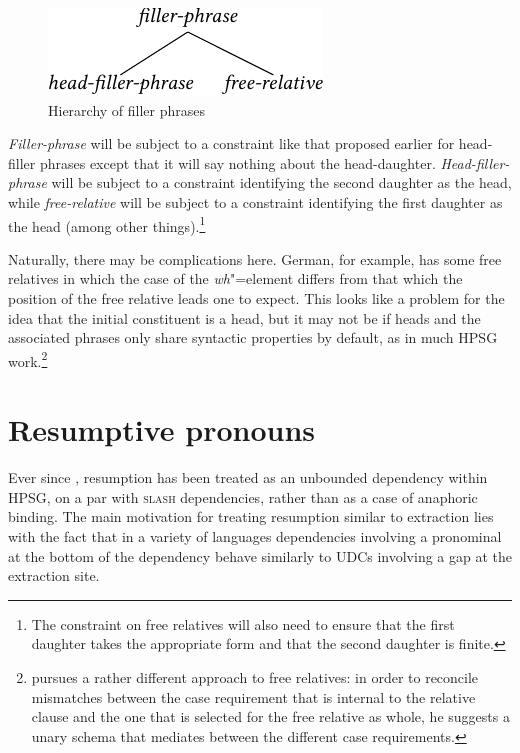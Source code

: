 \documentclass[output=paper
                ,modfonts
                ,nonflat
	        ,collection
	        ,collectionchapter
	        ,collectiontoclongg
 	        ,biblatex
                ,babelshorthands
                ,newtxmath
                ,draftmode
                ,colorlinks, citecolor=brown
]{./langsci/langscibook}
\begin{document}
{\begin{figure}[htb]
  \includegraphics{figures/BB-filler-phrase-crop}
  \caption{\label{fig:UDC:67}Hierarchy of filler phrases}
  
\end{figure}

\noindent
\textit{Filler-phrase} will be subject to a constraint like that proposed earlier
for head-filler phrases except that it will say nothing about the
head-daughter. \textit{Head-filler-phrase} will be subject to a constraint
identifying the second daughter as the head, while \textit{free-relative} will
be subject to a constraint identifying the first daughter as the head
(among other things).\footnote{The constraint on free relatives will also
  need to ensure that the first daughter takes the appropriate form and
  that the second daughter is finite.}

Naturally, there may be complications here. German, for example, has
some free relatives in which the case of the \emph{wh}"=element differs from
that which the position of the free relative leads one to expect. This
looks like a problem for the idea that the initial constituent is a
head, but it may not be if heads and the associated phrases only share
syntactic properties by default, as in much HPSG
work.\footnote{\citet{Mueller:99a} pursues a rather different approach
  to free relatives: in order to reconcile 
mismatches between the case requirement that is internal to the relative
clause and the one that is selected for the free relative as whole,
he suggests a unary schema that mediates between the
different case requirements.  }


\section{Resumptive pronouns}
\label{sec:UDC:ResumptivePronouns}

Ever since \citet{Vaillette:01}, resumption has been treated as an unbounded dependency within HPSG, on a par with \textsc{slash} dependencies, rather than as a case of anaphoric binding. The main motivation for treating resumption similar to extraction lies with the fact that in a variety of languages dependencies involving a pronominal at the bottom of the dependency behave similarly to UDCs involving a gap at the extraction site. 

}
\end{document}

